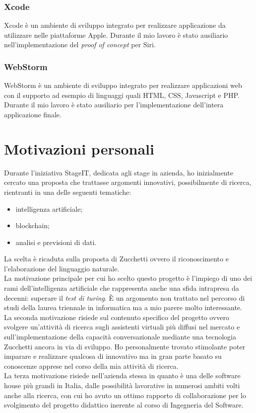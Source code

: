 		\subsubsection{Xcode}
		Xcode è un ambiente di sviluppo integrato per realizzare applicazione da utilizzare nelle piattaforme Apple. Durante il mio lavoro è stato ausiliario nell'implementazione del \textit{proof of concept} per Siri.
		\subsubsection{WebStorm}
		WebStorm è un ambiente di sviluppo integrato per realizzare applicazioni web con il supporto ad esempio di linguaggi quali HTML, CSS, Javascript e PHP. Durante il mio lavoro è stato ausiliario per l'implementazione dell'intera applicazione finale.

\section{Motivazioni personali}
Durante l'iniziativa StageIT, dedicata agli stage in azienda, ho inizialmente cercato una proposta che trattasse argomenti innovativi, possibilmente di ricerca, rientranti in una delle seguenti tematiche:
\begin{itemize}
	\item intelligenza artificiale;
	\item blockchain;
	\item analisi e previsioni di dati.
\end{itemize}
La scelta è ricaduta sulla proposta di Zucchetti ovvero il riconoscimento e l'elaborazione del linguaggio naturale. \\
La motivazione principale per cui ho scelto questo progetto è l'impiego di uno dei rami dell'intelligenza artificiale che rappresenta anche una sfida intrapresa da decenni: superare il \emph{test di turing}\glsfirstoccur. È un argomento non trattato nel percorso di studi della laurea triennale in informatica ma a mio parere molto interessante. \\
La seconda motivazione risiede sul contenuto specifico del progetto ovvero svolgere un'attività di ricerca sugli assistenti virtuali più diffusi nel mercato e sull'implementazione della capacità conversazionale mediante una tecnologia Zucchetti ancora in via di sviluppo. Ho personalmente trovato stimolante poter imparare e realizzare qualcosa di innovativo ma in gran parte basato su conoscenze apprese nel corso della mia attività di ricerca. \\
La terza motivazione risiede nell'azienda stessa in quanto è una delle software house più grandi in Italia, dalle possibilità lavorative in numerosi ambiti volti anche alla ricerca, con cui ho avuto un ottimo rapporto di collaborazione per lo svolgimento del progetto didattico inerente al corso di Ingegneria del Software.